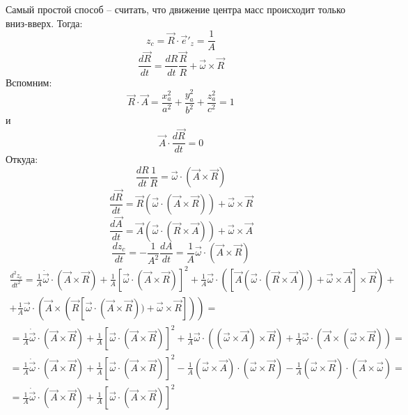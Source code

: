 Самый простой способ -- считать, что движение центра масс происходит только вниз-вверх. Тогда:
\[
	z_c = \vec{R}\cdot\vec{e}'_z = \frac{1}{A}
\]
\[
	\frac{d\vec{R}}{dt} = \frac{dR}{dt} \frac{\vec{R}}{R} + \vec{\omega} \times \vec{R}
\]
Вспомним:
\[
	\vec{R}\cdot\vec{A} = \frac{x_a^2}{a^2} + \frac{y_a^2}{b^2} + \frac{z_a^2}{c^2} = 1
\]
и 
\[
	\vec{A} \cdot \frac{d\vec{R}}{dt} = 0
\]
Откуда:
\[
	\frac{dR}{dt} \frac{1}{R} = \vec{\omega} \cdot (\vec{A} \times \vec{R})
\]
\[
	\frac{d\vec{R}}{dt} = \vec{R}(\vec{\omega} \cdot (\vec{A} \times \vec{R})) + \vec{\omega} \times \vec{R}
\]
\[
	\frac{d\vec{A}}{dt} = \vec{A}(\vec{\omega} \cdot (\vec{R} \times \vec{A})) + \vec{\omega} \times \vec{A}
\]
\[
	\frac{d z_c}{dt} = - \frac{1}{A^2} \frac{dA}{dt} = \frac{1}{A} \vec{\omega} \cdot (\vec{A} \times \vec{R})
\]
\[
	\begin{gathered}
	\frac{d^2 z_c}{dt^2} = 
	\frac{1}{A} \dot{\vec{\omega}} \cdot (\vec{A} \times \vec{R}) + 
	\frac{1}{A} [\vec{\omega} \cdot (\vec{A} \times \vec{R})]^2 + 
	\frac{1}{A} \vec{\omega} \cdot \left( \left[ \vec{A}(\vec{\omega} \cdot (\vec{R} \times \vec{A})) + \vec{\omega} \times \vec{A} \right] \times \vec{R}\right) + \\ +
	\frac{1}{A} \vec{\omega} \cdot (\vec{A} \times \left(\vec{R}\left[\vec{\omega} \cdot (\vec{A} \times \vec{R}))+ \vec{\omega} \times \vec{R}\right] \right)) = \\ =
	\frac{1}{A} \dot{\vec{\omega}} \cdot (\vec{A} \times \vec{R}) + 
	\frac{1}{A} [\vec{\omega} \cdot (\vec{A} \times \vec{R})]^2 + 
	\frac{1}{A} \vec{\omega} \cdot ( ( \vec{\omega} \times \vec{A}) \times \vec{R}) +
	\frac{1}{A} \vec{\omega} \cdot (\vec{A} \times ( \vec{\omega} \times \vec{R} )) = \\ =
	\frac{1}{A} \dot{\vec{\omega}} \cdot (\vec{A} \times \vec{R}) + 
	\frac{1}{A} [\vec{\omega} \cdot (\vec{A} \times \vec{R})]^2 - 
	\frac{1}{A} ( \vec{\omega} \times \vec{A}) \cdot ( \vec{\omega}  \times \vec{R}) -
	\frac{1}{A} ( \vec{\omega} \times \vec{R} ) \cdot (\vec{A} \times \vec{\omega} )
	= \\ =
	\frac{1}{A} \dot{\vec{\omega}} \cdot (\vec{A} \times \vec{R}) + 
	\frac{1}{A} [\vec{\omega} \cdot (\vec{A} \times \vec{R})]^2
	\end{gathered}
\]

